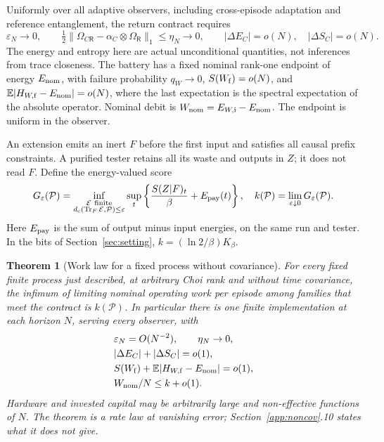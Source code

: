 \documentclass[11pt]{article}
\newtheorem{theorem}{Theorem}
\theoremstyle{definition}
\theoremstyle{remark}
\newcommand{\Tr}{\operatorname{Tr}}
\begin{document}
Uniformly over all adaptive observers, including cross-episode adaptation
and reference entanglement, the return contract requires
\[
 \varepsilon_N\to0,\qquad
 \tfrac12\|\Omega_{C\mathsf R}-\alpha_C\otimes\Omega_{\mathsf R}\|_1
 \le\eta_N\to0,\qquad
 |\Delta E_C|=o(N),\quad|\Delta S_C|=o(N).
\]
The energy and entropy here are actual unconditional quantities, not
inferences from trace closeness. The battery has a fixed nominal rank-one
endpoint of energy \(E_{\rm nom}\), with failure probability \(q_W\to0\),
\(S(W_{\rm f})=o(N)\), and
\(\mathbb E|H_{W,\rm f}-E_{\rm nom}|=o(N)\), where the last expectation is
the spectral expectation of the absolute operator. Nominal debit is
\(W_{\rm nom}=E_{W,\rm i}-E_{\rm nom}\).
The endpoint is uniform in the observer.

An extension emits an inert \(F\) before the first input and satisfies
all causal prefix constraints. A purified tester retains all its waste and
outputs in \(Z\); it does not read \(F\). Define the energy-valued score
\[
 G_\varepsilon(\mathcal P)=\inf_{\substack{\mathcal E\ {\rm finite}\\
 d_{\rm c}(\Tr_F\mathcal E,\mathcal P)\le\varepsilon}}
 \sup_t\left\{\frac{S(Z|F)_t}{\beta}+E_{\rm pay}(t)\right\},\quad
 k(\mathcal P)=\lim_{\varepsilon\downarrow0}G_\varepsilon(\mathcal P).
\]
Here \(E_{\rm pay}\) is the sum of output minus input energies, on the
same run and tester. In the bits of Section~\ref{sec:setting},
\(k=(\ln2/\beta)K_\beta\).

\begin{theorem}[Work law for a fixed process without covariance]\label{thm:noncovapp}
For every fixed finite process just described, at arbitrary Choi rank and
without time covariance, the infimum of limiting nominal operating work
per episode among families that meet the contract is \(k(\mathcal P)\).
In particular there is one finite implementation at each horizon \(N\),
serving every observer, with
\[
 \begin{aligned}
 &\varepsilon_N=O(N^{-2}),\qquad\eta_N\to0,\\
 &|\Delta E_C|+|\Delta S_C|=o(1),\\
 &S(W_{\rm f})+\mathbb E|H_{W,\rm f}-E_{\rm nom}|=o(1),\\
 &W_{\rm nom}/N\le k+o(1).
 \end{aligned}
\]
Hardware and invested capital may be arbitrarily large and non-effective
functions of \(N\). The theorem is a rate law at vanishing error; Section~\ref{app:noncov}.10 states what it does not give.
\end{theorem}
\end{document}
